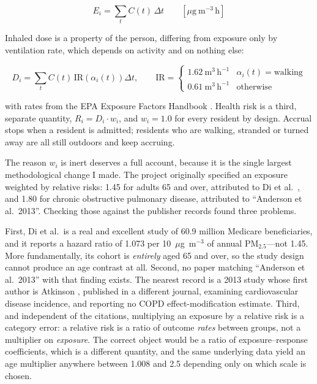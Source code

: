 \documentclass[graybox]{svmult}
\begin{document}
\begin{equation}
\label{eq:exposure}
E_i = \sum_{t} C(t)\,\Delta t
\qquad [\mu\mathrm{g\ m}^{-3}\,\mathrm{h}]
\end{equation}

Inhaled dose is a property of the person, differing from exposure only by
ventilation rate, which depends on activity and on nothing else:

\begin{equation}
\label{eq:dose}
D_i = \sum_{t} C(t)\,\mathrm{IR}\!\left(\alpha_i(t)\right)\Delta t,
\qquad
\mathrm{IR} =
\begin{cases}
1.62\ \mathrm{m^3\,h^{-1}} & \alpha_i(t) = \text{walking}\\
0.61\ \mathrm{m^3\,h^{-1}} & \text{otherwise}
\end{cases}
\end{equation}

\noindent with rates from the EPA Exposure Factors Handbook \cite{epaefh2011}.
Health risk is a third, separate quantity, $R_i = D_i \cdot w_i$, and
$w_i = 1.0$ for every resident by design. Accrual stops when a resident is
admitted; residents who are walking, stranded or turned away are all still
outdoors and keep accruing.

The reason $w_i$ is inert deserves a full account, because it is the single
largest methodological change I made. The project originally specified an
exposure weighted by relative risks: 1.45 for adults 65 and over, attributed to
Di et al.\ \cite{di2017}, and 1.80 for chronic obstructive pulmonary disease,
attributed to ``Anderson et al.\ 2013''. Checking those against the publisher
records found three problems.

First, Di et al.\ is a real and excellent study of 60.9 million Medicare
beneficiaries, and it reports a hazard ratio of 1.073 per 10~$\mu$g~m$^{-3}$ of
annual PM$_{2.5}$---not 1.45. More fundamentally, its cohort is \emph{entirely}
aged 65 and over, so the study design cannot produce an age contrast at all.
Second, no paper matching ``Anderson et al.\ 2013'' with that finding exists.
The nearest record is a 2013 study whose first author is Atkinson
\cite{atkinson2013}, published in a different journal, examining cardiovascular
disease incidence, and reporting no COPD effect-modification estimate. Third,
and independent of the citations, multiplying an exposure by a relative risk is
a category error: a relative risk is a ratio of outcome \emph{rates} between
groups, not a multiplier on \emph{exposure}. The correct object would be a ratio
of exposure--response coefficients, which is a different quantity, and the same
underlying data yield an age multiplier anywhere between 1.008 and 2.5 depending
only on which scale is chosen.
\end{document}
